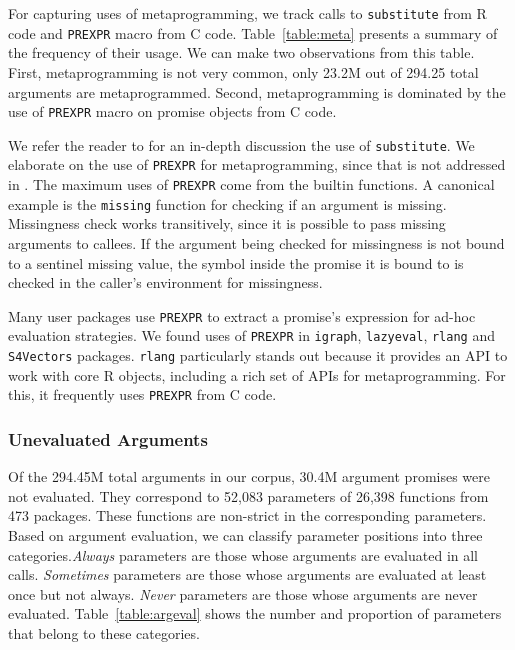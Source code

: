\documentclass[review,nonacm,screen,acmsmall,anonymous=true]{acmart}
\newcommand{\always}{\emph{Always}\xspace}
\newcommand{\sometimes}{\emph{Sometimes}\xspace}
\newcommand{\never}{\emph{Never}\xspace}
\newcommand{\code}[1]{\lstinline |#1|\xspace}
\begin{document}
For capturing uses of metaprogramming, we track calls to \code{substitute} from
R code and \code{PREXPR} macro from C code. Table~\ref{table:meta} presents a
summary of the frequency of their usage. We can make two observations from this
table. First, metaprogramming is not very common, only 23.2M out of 294.25 total
arguments are metaprogrammed. Second, metaprogramming is dominated by the use of
\code{PREXPR} macro on promise objects from C code.

We refer the reader to \citet{oopsla19b} for an in-depth discussion the use of
\code{substitute}. We elaborate on the use of \code{PREXPR} for metaprogramming,
since that is not addressed in \cite{oopsla19b}. The maximum uses of
\code{PREXPR} come from the builtin functions. A canonical example is the
\code{missing} function for checking if an argument is missing. Missingness
check works transitively, since it is possible to pass missing arguments to
callees. If the argument being checked for missingness is not bound to a
sentinel missing value, the symbol inside the promise it is bound to is checked
in the caller's environment for missingness.

Many user packages use \code{PREXPR} to extract a promise's expression for
ad-hoc evaluation strategies. We found uses of \code{PREXPR} in \code{igraph},
\code{lazyeval}, \code{rlang} and \code{S4Vectors} packages. \code{rlang}
particularly stands out because it provides an API to work with core R objects,
including a rich set of APIs for metaprogramming. For this, it frequently uses
\code{PREXPR} from C code.

\subsubsection{Unevaluated Arguments}

Of the 294.45M total arguments in our corpus, 30.4M argument promises were not
evaluated. They correspond to 52,083 parameters of 26,398 functions from 473
packages. These functions are non-strict in the corresponding parameters.
%
Based on argument evaluation, we can classify parameter positions into three
categories.\always parameters are those whose arguments are evaluated in all
calls. \sometimes parameters are those whose arguments are evaluated at least
once but not always. \never parameters are those whose arguments are never
evaluated. Table~\ref{table:argeval} shows the number and proportion of
parameters that belong to these categories.
\end{document}
